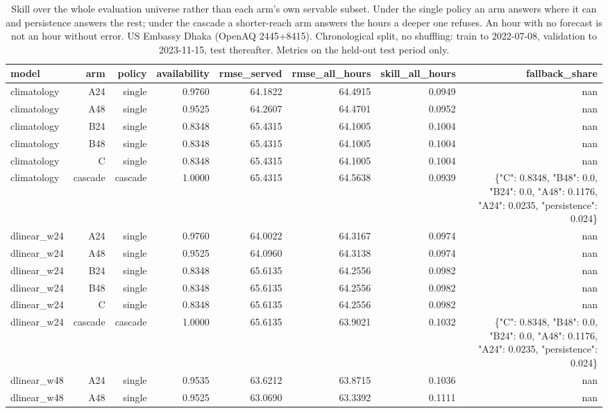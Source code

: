 \begin{table}[htbp]
\caption{Skill over the whole evaluation universe rather than each arm's own servable subset. Under the single policy an arm answers where it can and persistence answers the rest; under the cascade a shorter-reach arm answers the hours a deeper one refuses. An hour with no forecast is not an hour without error. US Embassy Dhaka (OpenAQ 2445+8415). Chronological split, no shuffling: train to 2022-07-08, validation to 2023-11-15, test thereafter. Metrics on the held-out test period only.}
\label{tab:lookback_all_hours}
\begin{tabular}{lrrrrrrr}
\toprule
model & arm & policy & availability & rmse\_served & rmse\_all\_hours & skill\_all\_hours & fallback\_share \\
\midrule
climatology & A24 & single & 0.9760 & 64.1822 & 64.4915 & 0.0949 & nan \\
climatology & A48 & single & 0.9525 & 64.2607 & 64.4701 & 0.0952 & nan \\
climatology & B24 & single & 0.8348 & 65.4315 & 64.1005 & 0.1004 & nan \\
climatology & B48 & single & 0.8348 & 65.4315 & 64.1005 & 0.1004 & nan \\
climatology & C & single & 0.8348 & 65.4315 & 64.1005 & 0.1004 & nan \\
climatology & cascade & cascade & 1.0000 & 65.4315 & 64.5638 & 0.0939 & \{"C": 0.8348, "B48": 0.0, "B24": 0.0, "A48": 0.1176, "A24": 0.0235, "persistence": 0.024\} \\
dlinear\_w24 & A24 & single & 0.9760 & 64.0022 & 64.3167 & 0.0974 & nan \\
dlinear\_w24 & A48 & single & 0.9525 & 64.0960 & 64.3138 & 0.0974 & nan \\
dlinear\_w24 & B24 & single & 0.8348 & 65.6135 & 64.2556 & 0.0982 & nan \\
dlinear\_w24 & B48 & single & 0.8348 & 65.6135 & 64.2556 & 0.0982 & nan \\
dlinear\_w24 & C & single & 0.8348 & 65.6135 & 64.2556 & 0.0982 & nan \\
dlinear\_w24 & cascade & cascade & 1.0000 & 65.6135 & 63.9021 & 0.1032 & \{"C": 0.8348, "B48": 0.0, "B24": 0.0, "A48": 0.1176, "A24": 0.0235, "persistence": 0.024\} \\
dlinear\_w48 & A24 & single & 0.9535 & 63.6212 & 63.8715 & 0.1036 & nan \\
dlinear\_w48 & A48 & single & 0.9525 & 63.0690 & 63.3392 & 0.1111 & nan \\

\end{tabular}
\end{table}
